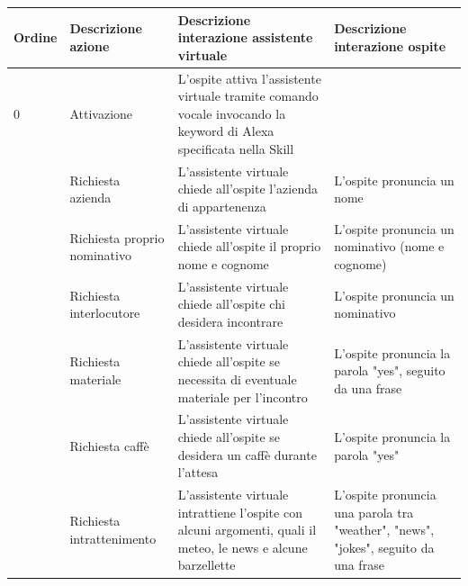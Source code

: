 \documentclass[../DefinizioneDiProdotto_v2.0.0.tex]{subfiles}
\begin{document}
\begin{longtable} [c] {
	>{\centering}p{1.5cm}
	p{2cm}
	p{6cm}
	p{5cm} }
	\toprule
	\textbf{Ordine} & \textbf{Descrizione azione}  & \textbf{Descrizione interazione assistente virtuale}                                                          & \textbf{Descrizione interazione ospite}                                            \\
	\midrule
	\arrayrulecolor{gray}
	0 & Attivazione & L'ospite attiva l'assistente virtuale tramite comando vocale invocando la keyword di Alexa specificata nella Skill \\
	\addlinespace[0.4em]
	\midrule
	\addlinespace[0.4em]
	1               & Richiesta azienda            & L'assistente virtuale chiede all'ospite l'azienda di appartenenza                                             & L'ospite pronuncia un nome                                                         \\
	\addlinespace[0.4em]
	\midrule
	\addlinespace[0.4em]
	2               & Richiesta proprio nominativo & L'assistente virtuale chiede all'ospite il proprio nome e cognome                                             & L'ospite pronuncia un nominativo (nome e cognome)                                  \\
	\addlinespace[0.4em]
	\midrule
	\addlinespace[0.4em]
	3               & Richiesta interlocutore      & L'assistente virtuale chiede all'ospite chi desidera incontrare                                               & L'ospite pronuncia un nominativo                                                   \\
	\addlinespace[0.4em]
	\midrule
	\addlinespace[0.4em]
	4               & Richiesta materiale          & L'assistente virtuale chiede all'ospite se necessita di eventuale materiale per l'incontro                    & L'ospite pronuncia la parola "yes", seguito da una frase                           \\
	\addlinespace[0.4em]
	\midrule
	\addlinespace[0.4em]
	5               & Richiesta caffè             & L'assistente virtuale chiede all'ospite se desidera un caffè durante l'attesa                                & L'ospite pronuncia la parola "yes"                                                 \\
	\addlinespace[0.4em]
	\midrule
	\addlinespace[0.4em]
	6               & Richiesta intrattenimento    & L'assistente virtuale intrattiene l'ospite con alcuni argomenti, quali il meteo, le news e alcune barzellette & L'ospite pronuncia una parola tra "weather", "news", "jokes", seguito da una frase \\

\end{longtable}
\end{document}

